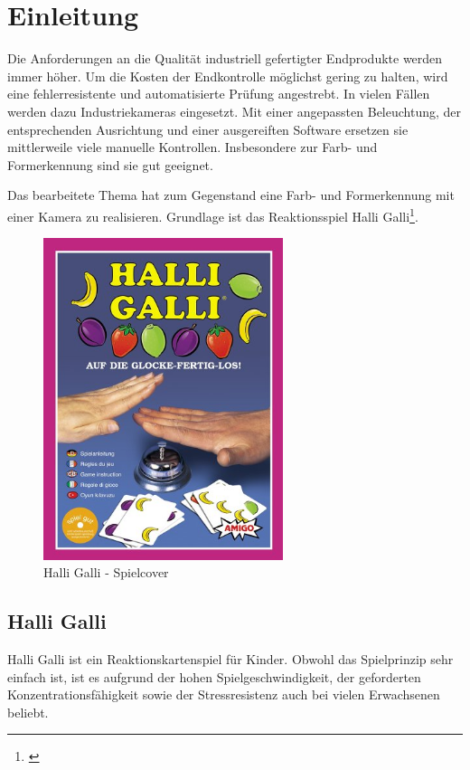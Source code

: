 
\section{Einleitung}
\label{sec:Einleitung}

Die Anforderungen an die Qualität industriell gefertigter Endprodukte werden immer höher. Um die Kosten der Endkontrolle möglichst gering zu halten, wird eine fehlerresistente und automatisierte Prüfung angestrebt. In vielen Fällen werden dazu Industriekameras eingesetzt. Mit einer angepassten Beleuchtung, der entsprechenden Ausrichtung und einer ausgereiften Software ersetzen sie mittlerweile viele manuelle Kontrollen. Insbesondere zur Farb- und Formerkennung sind sie gut geeignet.

Das bearbeitete Thema hat zum Gegenstand eine Farb- und Formerkennung mit einer Kamera zu realisieren. Grundlage ist das Reaktionsspiel Halli Galli\footnote{\cite{HalliGalli}}.

\begin{figure}[H]
    \centering
    \includegraphics[width=7cm]{Abbildungen/cover}
    \caption[Cocer]{Halli Galli - Spielcover}
    \label{fig:Cover}
\end{figure}

\subsection{Halli Galli}

Halli Galli ist ein Reaktionskartenspiel für Kinder. Obwohl das Spielprinzip sehr einfach ist, ist es aufgrund der hohen Spielgeschwindigkeit, der geforderten Konzentrationsfähigkeit sowie der Stressresistenz auch bei vielen Erwachsenen beliebt.

